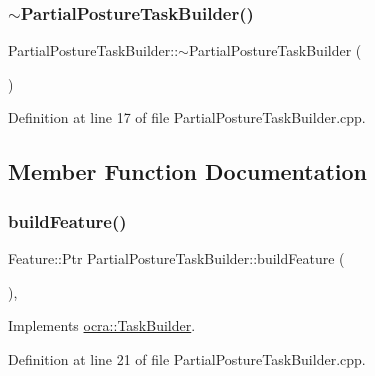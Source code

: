 \subsubsection{\texorpdfstring{$\sim$\+Partial\+Posture\+Task\+Builder()}{~PartialPostureTaskBuilder()}}
{\footnotesize\ttfamily Partial\+Posture\+Task\+Builder\+::$\sim$\+Partial\+Posture\+Task\+Builder (\begin{DoxyParamCaption}{ }\end{DoxyParamCaption})\hspace{0.3cm}{\ttfamily [virtual]}}



Definition at line 17 of file Partial\+Posture\+Task\+Builder.\+cpp.



\subsection{Member Function Documentation}
\hypertarget{classocra_1_1PartialPostureTaskBuilder_ab4a80855ccc820bbeabf4eed87487784}{}\label{classocra_1_1PartialPostureTaskBuilder_ab4a80855ccc820bbeabf4eed87487784} 
\subsubsection{\texorpdfstring{build\+Feature()}{buildFeature()}}
{\footnotesize\ttfamily Feature\+::\+Ptr Partial\+Posture\+Task\+Builder\+::build\+Feature (\begin{DoxyParamCaption}{ }\end{DoxyParamCaption})\hspace{0.3cm}{\ttfamily [protected]}, {\ttfamily [virtual]}}



Implements \hyperlink{classocra_1_1TaskBuilder_a58c0dc416a9607a344a080248ee26ac2}{ocra\+::\+Task\+Builder}.



Definition at line 21 of file Partial\+Posture\+Task\+Builder.\+cpp.

\hypertarget{classocra_1_1PartialPostureTaskBuilder_a1a853459b32e838d04205459c608f5b2}{}\label{classocra_1_1PartialPostureTaskBuilder_a1a853459b32e838d04205459c608f5b2} 
